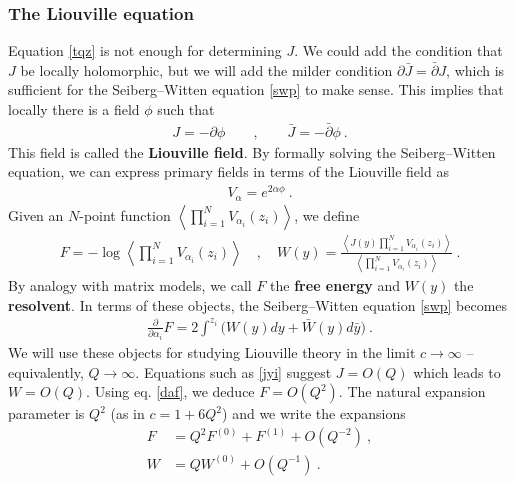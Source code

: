 \documentclass[12pt, a4paper, notitlepage, twoside]{report}
\numberwithin{equation}{section}
\theoremstyle{break}
\begin{document}
\subsubsection{The Liouville equation}

Equation \eqref{tqz} is not enough for determining $J$. We could add the condition that $J$ be locally holomorphic, but we will add the milder condition $\partial \bar J = \bar\partial J$, 
which is sufficient for the Seiberg--Witten equation \eqref{swp} to make sense. This implies that locally there is a field $\phi$ such that 
\begin{align}
 J = -\partial \phi \qquad , \qquad \bar J = -\bar\partial \phi \ .
\end{align}
This field is called the \textbf{Liouville field}. By formally solving the Seiberg--Witten equation, we can express primary fields in terms of the Liouville field as 
\begin{align}
 V_\alpha = e^{2\alpha \phi} \ .
\end{align}
Given an $N$-point function $\left\langle \prod_{i=1}^N V_{\alpha_i}(z_i) \right\rangle$, we define
\begin{align}
 \boxed{F= -\log \left\langle \prod_{i=1}^N V_{\alpha_i}(z_i) \right\rangle} \quad , \quad \boxed{W(y) = \frac{\left\langle J(y)\prod_{i=1}^N V_{\alpha_i}(z_i) \right\rangle}{\left\langle \prod_{i=1}^N V_{\alpha_i}(z_i) \right\rangle}} \ .
\end{align}
By analogy with matrix models, we call $F$ the \textbf{\boldmath free energy} and $W(y)$ the \textbf{resolvent}.
In terms of these objects, the Seiberg--Witten equation \eqref{swp} becomes 
\begin{align}
 {\frac{\partial}{\partial \alpha_i}} F = 2 \int^{z_i} \Big(W(y)dy+\bar W(y)d\bar y\Big)\ . 
\label{daf}
\end{align}
We will use these objects for studying Liouville theory in the limit $c\to \infty$ -- equivalently, $Q\to \infty$.
Equations such as \eqref{jyi} suggest $J=O(Q)$ which leads to $W=O(Q)$.
Using eq. \eqref{daf}, we deduce $F=O(Q^2)$.
The natural expansion parameter is $Q^2$ (as in $c=1+6Q^2$) and we write the expansions
\begin{align}
 F &= Q^2 F^{(0)} + F^{(1)} + O(Q^{-2})\ ,
\\
W & = QW^{(0)} + O(Q^{-1})\ .
\end{align}
\end{document}
